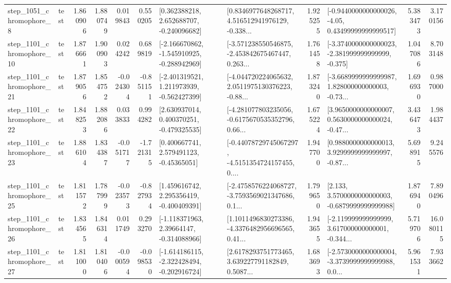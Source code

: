 \begin{tabular}{llrrrrllrlrr}
  step\_1051\_chromophore\_8 &      test &      1.860906 &    1.880749 &      0.019843 &  0.550205 &    [0.362388218, 2.652688707, -0.240096682] &  [0.8346977648268717, 4.516512941976129, -0.338... &       1.925255 &  [-0.9440000000000026, -4.05, 0.43499999999999517] &            5.383473 &          3.170156 \\
 step\_1101\_chromophore\_10 &      test &      1.876661 &    1.900903 &      0.024242 &  0.689819 &  [-2.166670862, -1.545910925, -0.288942969] &  [-3.571238550546875, -2.453842675467447, 0.263... &       1.761458 &  [-3.3740000000000023, -2.381999999999999, -0.375] &            1.047086 &          8.703148 \\
 step\_1101\_chromophore\_21 &      test &      1.879056 &    1.854752 &     -0.024304 & -0.851151 &   [-2.401319521, 1.211973939, -0.562427399] &  [-4.044720224065632, 2.0511975130376223, -0.88... &       1.873240 &  [-3.6689999999999987, 1.828000000000003, -0.73... &            1.696930 &          0.987000 \\
 step\_1101\_chromophore\_22 &      test &      1.848253 &    1.882086 &      0.033833 &  0.994282 &    [2.630937014, 0.400370251, -0.479325535] &  [-4.281077803235056, -0.6175670535352796, 0.66... &       1.675224 &  [3.9650000000000007, 0.5630000000000024, -0.47... &            3.436473 &          1.984437 \\
 step\_1101\_chromophore\_23 &      test &      1.886104 &    1.834387 &     -0.051717 & -1.721315 &     [0.400667741, 2.579491123, -0.45365051] &  [-0.44078729745067297, -4.5151354724157455, 0.... &       1.947700 &  [0.9880000000000013, 3.9299999999999997, -0.87... &            5.698915 &          9.245576 \\
 step\_1101\_chromophore\_25 &      test &      1.811572 &    1.787999 &     -0.023573 & -0.827934 &    [1.459616742, 2.295356419, -0.400409391] &  [-2.4758576224068727, -3.7593569021347686, 0.1... &       1.799650 &   [2.133, 3.5700000000000003, -0.6879999999999988] &            1.876940 &          7.890496 \\
 step\_1101\_chromophore\_26 &      test &      1.834565 &    1.846314 &      0.011749 &  0.293270 &    [-1.118371963, 2.39664147, -0.314088966] &  [1.1011496830273386, -4.3376482956696565, 0.41... &       1.943655 &  [-2.119999999999999, 3.617000000000001, -0.344... &            5.719706 &         16.080115 \\
 step\_1101\_chromophore\_27 &      test &      1.811000 &    1.810406 &     -0.000594 & -0.098530 &  [-1.614186115, -2.322428494, -0.202916724] &  [2.6178293751773465, 3.639227791182849, 0.5087... &       1.683693 &  [-2.5730000000000004, -3.3739999999999988, 0.0... &            5.961531 &          7.933662 \\

\end{tabular}
